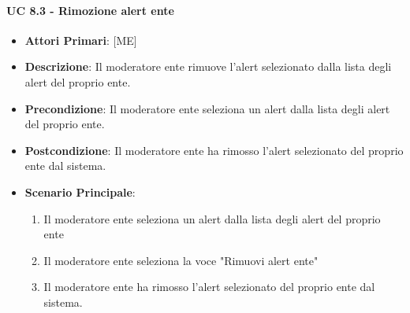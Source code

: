 			\paragraph{UC 8.3 - Rimozione alert ente}
			\begin{itemize}
				\item \textbf{Attori Primari}: [ME]
				\item \textbf{Descrizione}: Il moderatore ente rimuove l'alert selezionato dalla lista degli alert del proprio ente.
				\item \textbf{Precondizione}: Il moderatore ente seleziona un alert dalla lista degli alert del proprio ente.
				\item \textbf{Postcondizione}: Il moderatore ente ha rimosso l'alert selezionato del proprio ente dal sistema.
				\item \textbf{Scenario Principale}:
				\begin{enumerate}
					\item{Il moderatore ente seleziona un alert dalla lista degli alert del proprio ente}
					\item{Il moderatore ente seleziona la voce "Rimuovi alert ente"}
					\item{Il moderatore ente ha rimosso l'alert selezionato del proprio ente dal sistema.}
				\end{enumerate}	
			\end{itemize}